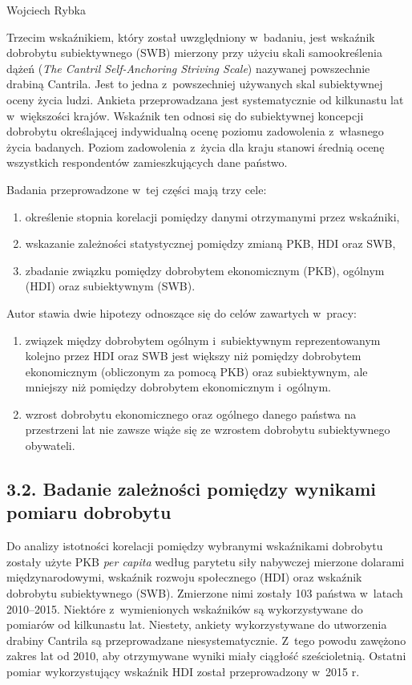\begin{artplenv}{Wojciech Rybka}

Trzecim wskaźnikiem, który został uwzględniony w~badaniu, jest wskaźnik dobrobytu subiektywnego (SWB) mierzony przy
użyciu skali samookreślenia dążeń (\textit{The Cantril Self-Anchoring Striving Scale}) nazywanej powszechnie drabiną
Cantrila. Jest to jedna z~powszechniej używanych skal subiektywnej oceny życia ludzi. Ankieta przeprowadzana jest
systematycznie od kilkunastu lat w~większości krajów. Wskaźnik ten odnosi się do subiektywnej koncepcji dobrobytu
określającej indywidualną ocenę poziomu zadowolenia z~własnego życia badanych. Poziom zadowolenia z~życia dla kraju
stanowi średnią ocenę wszystkich respondentów zamieszkujących dane państwo.

Badania przeprowadzone w~tej części mają trzy cele:

\begin{enumerate}
\item określenie stopnia korelacji pomiędzy danymi otrzymanymi przez wskaźniki,
\item wskazanie zależności statystycznej pomiędzy zmianą PKB, HDI oraz SWB,
\item zbadanie związku pomiędzy dobrobytem ekonomicznym (PKB), ogólnym (HDI) oraz subiektywnym (SWB).
\end{enumerate}
Autor stawia dwie hipotezy odnoszące się do celów zawartych w~pracy:

\begin{enumerate}
\item związek między dobrobytem ogólnym i~subiektywnym reprezentowanym kolejno przez HDI oraz SWB jest większy niż
pomiędzy dobrobytem ekonomicznym (obliczonym za pomocą PKB) oraz subiektywnym, ale mniejszy niż pomiędzy dobrobytem
ekonomicznym i~ogólnym.
\item wzrost dobrobytu ekonomicznego oraz ogólnego danego państwa na przestrzeni lat nie zawsze wiąże się ze wzrostem
dobrobytu subiektywnego obywateli.
\end{enumerate}
\subsection{3.2. Badanie zależności pomiędzy wynikami pomiaru dobrobytu}
Do analizy istotności korelacji pomiędzy wybranymi wskaźnikami dobrobytu zostały użyte PKB \textit{per capita} według parytetu
siły nabywczej mierzone dolarami międzynarodowymi, wskaźnik rozwoju społecznego (HDI) oraz wskaźnik dobrobytu
subiektywnego (SWB). Zmierzone nimi zostały 103 państwa w~latach 2010--2015. Niektóre z~wymienionych wskaźników są
wykorzystywane do pomiarów od kilkunastu lat. Niestety, ankiety wykorzystywane do utworzenia drabiny Cantrila są
przeprowadzane niesystematycznie. Z~tego powodu zawężono zakres lat od 2010, aby otrzymywane wyniki miały ciągłość
sześcioletnią. Ostatni pomiar wykorzystujący wskaźnik HDI został przeprowadzony w~2015 r. 


\end{artplenv}

